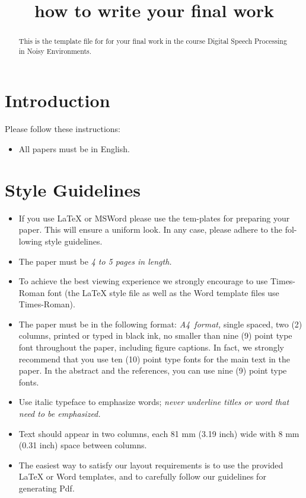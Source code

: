 \documentclass[a4paper]{article}
\title{how to write your final work}
\begin{document}
\maketitle

\begin{abstract}
{\ninept This is the template file for for your final work in the
course Digital Speech Processing in Noisy Environments.}
\end{abstract}

\section{Introduction}

Please follow these instructions:
\begin{itemize}
\item All papers must be in English.
\end{itemize}

\section{Style Guidelines}
\begin{itemize}
\item If you use LaTeX or MSWord please use the tem-plates for
 preparing your paper. This will ensure a uniform look. In any case,
  please adhere to the fol-lowing style guidelines.
\item The paper must be {\em 4 to \em 5 pages in
    length.}
\item To achieve the best viewing experience we strongly encourage to
  use Times-Roman font (the \LaTeX{} style file as well as the Word
  template files use Times-Roman).
\item The paper must be in the following format: {\em A4~format,} single
  spaced, two (2) columns, printed or typed in black ink, no smaller
  than nine (9) point type font throughout the paper, including figure
  captions. In fact, we strongly recommend that you use ten (10) point
  type fonts for the main text in the paper. In the abstract and the
  references, you can use nine (9) point type fonts.
\item Use italic typeface to emphasize words; {\em never underline titles
  or word that need to be emphasized.}
\item  Text should appear in two columns, each 81
  mm (3.19 inch) wide with
  8 mm (0.31 inch)
  space between columns.
\item The easiest way to satisfy our layout requirements is to use the
  provided \LaTeX{} or Word templates, and to carefully follow our
  guidelines for generating Pdf.
\end{itemize}
\end{document}
